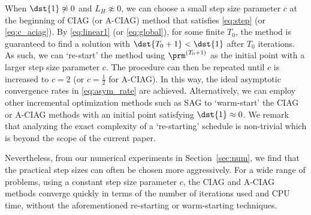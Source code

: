 \documentclass[smallextended]{svjour3}       %
\begin{document}
When $\dst{1} \not\approx 0$ and $L_H \not\approx 0$, we can choose a small step size parameter $c$ at the beginning of {\sf CIAG} (or {\sf A-CIAG}) method that satisfies \eqref{eq:step} (or \eqref{eq:c_aciag}). By \eqref{eq:linear1} (or \eqref{eq:global}), for some finite $T_0$, the method is guaranteed to find a solution with $\dst{T_0+1} < \dst{1}$ after $T_0$ iterations. As such, we can `re-start' the method using $\prm^{(T_0+1)}$ as the initial point with a larger step size parameter $c$. The procedure can then be repeated until $c$ is increased to $c=2$ (or $c=\frac{1}{2}$ for {\sf A-CIAG}). In this way, the ideal asymptotic convergence rates in \eqref{eq:asym_rate} are achieved. 
Alternatively, we can employ other incremental optimization methods such as SAG \cite{schmidt2017minimizing} to `warm-start' the {\sf CIAG} or {\sf A-CIAG} methods with an initial point satisfying $\dst{1} \approx 0$. 
We remark that analyzing the exact complexity of a `re-starting' schedule is non-trivial which is beyond the scope of the current paper.

Nevertheless, from our numerical experiments in Section~\ref{sec:num}, we find that 
the practical step sizes can often be chosen more aggressively. For a wide range of problems, using a constant step size parameter $c$, the {\sf CIAG} and {\sf A-CIAG} methods converge quickly in terms of the number of iterations used and CPU time, without the aforementioned re-starting or warm-starting techniques.
\end{document}
